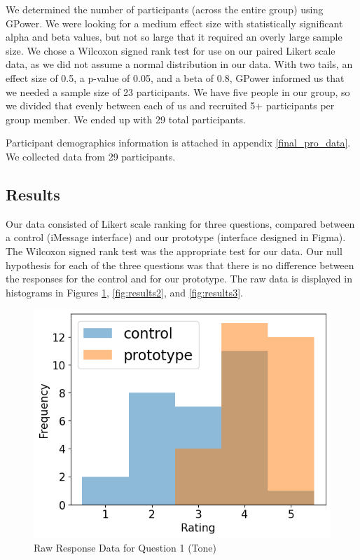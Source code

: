 \documentclass[acmsmall,screen,authorversion,nonacm]{acmart}
\begin{document}
We determined the number of participants (across the entire group) using GPower. We were looking for a medium effect size with statistically significant alpha and beta values, but not so large that it required an overly large sample size. We chose a Wilcoxon signed rank test for use on our paired Likert scale data, as we did not assume a normal distribution in our data. With two tails, an effect size of 0.5, a p-value of 0.05, and a beta of 0.8, GPower informed us that we needed a sample size of 23 participants. We have five people in our group, so we divided that evenly between each of us and recruited 5+ participants per group member. We ended up with 29 total participants.

Participant demographics information is attached in appendix \ref{final_pro_data}. We collected data from 29 participants. 

\subsection{Results}
\label{sec:user_eval_results}

Our data consisted of Likert scale ranking for three questions, compared between a control (iMessage interface) and our prototype (interface designed in Figma). The Wilcoxon signed rank test was the appropriate test for our data. Our null hypothesis for each of the three questions was that there is no difference between the responses for the control and for our prototype. The raw data is displayed in histograms in Figures \ref{fig:results1}, \ref{fig:results2}, and \ref{fig:results3}.

\begin{figure}[H]
\begin{center}
\includegraphics[width=0.6\linewidth]{figures/stats_resultsoutput.new.png}
\caption{Raw Response Data for Question 1 (Tone)}
\label{fig:results1}
\Description{}
\end{center}
\end{figure}
\end{document}
